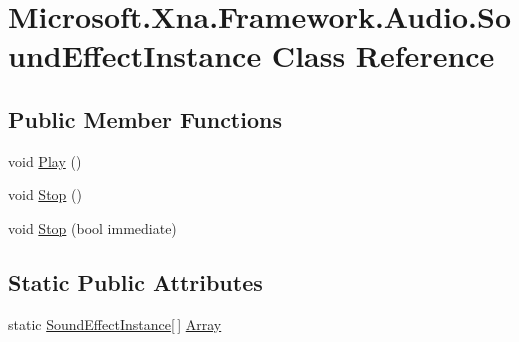 \hypertarget{class_microsoft_1_1_xna_1_1_framework_1_1_audio_1_1_sound_effect_instance}{}\section{Microsoft.\+Xna.\+Framework.\+Audio.\+Sound\+Effect\+Instance Class Reference}
\label{class_microsoft_1_1_xna_1_1_framework_1_1_audio_1_1_sound_effect_instance}
\subsection*{Public Member Functions}
\begin{DoxyCompactItemize}
\item 
void \hyperlink{class_microsoft_1_1_xna_1_1_framework_1_1_audio_1_1_sound_effect_instance_ad5e613e4a36f037e1bc797ec838d6da3}{Play} ()
\item 
void \hyperlink{class_microsoft_1_1_xna_1_1_framework_1_1_audio_1_1_sound_effect_instance_a701a2d90aa46a38ccbef2d0f734cf307}{Stop} ()
\item 
void \hyperlink{class_microsoft_1_1_xna_1_1_framework_1_1_audio_1_1_sound_effect_instance_a85a32f3773a12079f4b4f33f3fa316f9}{Stop} (bool immediate)
\end{DoxyCompactItemize}
\subsection*{Static Public Attributes}
\begin{DoxyCompactItemize}
\item 
static \hyperlink{class_microsoft_1_1_xna_1_1_framework_1_1_audio_1_1_sound_effect_instance}{Sound\+Effect\+Instance}\mbox{[}$\,$\mbox{]} \hyperlink{class_microsoft_1_1_xna_1_1_framework_1_1_audio_1_1_sound_effect_instance_a37b6f028898bef4caff859360b4a3b39}{Array}
\end{DoxyCompactItemize}
